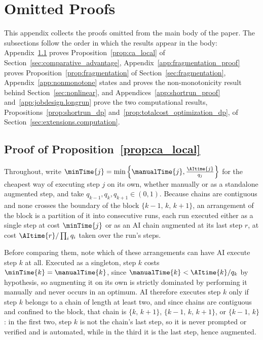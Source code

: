 \section{Omitted Proofs}
\label{app:omitted_proofs}

This appendix collects the proofs omitted from the main body of the paper.
The subsections follow the order in which the results appear in the body: Appendix~\ref{app:ca_local_proof} proves Proposition~\ref{prop:ca_local} of Section~\ref{sec:comparative_advantage}, Appendix~\ref{app:fragmentation_proof} proves Proposition~\ref{prop:fragmentation} of Section~\ref{sec:fragmentation}, Appendix~\ref{app:nonmonotone} states and proves the non-monotonicity result behind Section~\ref{sec:nonlinear}, and Appendices~\ref{app:shortrun_proof} and~\ref{app:jobdesign.longrun} prove the two computational results, Propositions~\ref{prop:shortrun_dp} and~\ref{prop:totalcost_optimization_dp}, of Section~\ref{sec:extensions.computation}.

\subsection{Proof of Proposition~\ref{prop:ca_local}}
\label{app:ca_local_proof}

Throughout, write $\minTime{j} = \min\left\{\manualTime{j}, \frac{\AItime{j}}{q_j}\right\}$ for the cheapest way of executing step $j$ on its own, whether manually or as a standalone augmented step, and take $q_{k-1}, q_k, q_{k+1} \in (0,1)$.
Because chains are contiguous and none crosses the boundary of the block $\{k-1,\, k,\, k+1\}$, an arrangement of the block is a partition of it into consecutive runs, each run executed either as a single step at cost $\minTime{j}$ or as an AI chain augmented at its last step $r$, at cost $\AItime{r}/\prod_i q_i$ taken over the run's steps.

Before comparing them, note which of these arrangements can have AI execute step $k$ at all.
Executed as a singleton, step $k$ costs $\minTime{k} = \manualTime{k}$, since $\manualTime{k} < \AItime{k}/q_k$ by hypothesis, so augmenting it on its own is strictly dominated by performing it manually and never occurs in an optimum.
AI therefore executes step $k$ only if step $k$ belongs to a chain of length at least two, and since chains are contiguous and confined to the block, that chain is $\{k,\, k+1\}$, $\{k-1,\, k,\, k+1\}$, or $\{k-1,\, k\}$: in the first two, step $k$ is not the chain's last step, so it is never prompted or verified and is automated, while in the third it is the last step, hence augmented.

